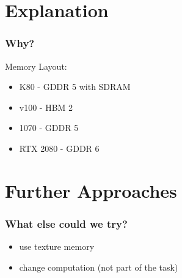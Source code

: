 \documentclass[aspectratio=169]{beamer}
\begin{document}
\begin{frame}
\end{frame}

\section{Explanation}
\begin{frame}
	\frametitle{Why?}
	Memory Layout:
	\begin{itemize}
		\item K80 - GDDR 5 with SDRAM
		\item v100 - HBM 2
		\item 1070 - GDDR 5
		\item RTX 2080 - GDDR 6
	\end{itemize}
\end{frame}

\section{Further Approaches}
\begin{frame}
	\frametitle{What else could we try?}
	\begin{itemize}
		\item use texture memory
		\item change computation (not part of the task)
	\end{itemize}
\end{frame}
\end{document}
